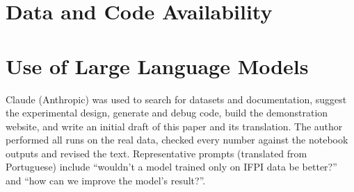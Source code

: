 \documentclass[12pt]{article}
\begin{document}
\section*{Data and Code Availability}


\section*{Use of Large Language Models}

Claude (Anthropic) was used to search for datasets and documentation, suggest the experimental design, generate
and debug code, build the demonstration website, and write an initial draft of this paper and its translation. The
author performed all runs on the real data, checked every number against the notebook outputs and revised the text.
Representative prompts (translated from Portuguese) include ``wouldn't a model trained only on IFPI data be
better?'' and ``how can we improve the model's result?''.



\end{document}
